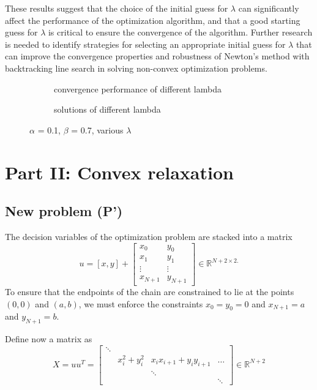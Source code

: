 \documentclass[10pt,a4paper,notitlepage,twocolumn]{article}
\begin{document}
These results suggest that the choice of the initial guess for $\lambda$ can significantly affect the performance of the optimization algorithm, and that a good starting guess for $\lambda$ is critical to ensure the convergence of the algorithm. Further research is needed to identify strategies for selecting an appropriate initial guess for $\lambda$ that can improve the convergence properties and robustness of Newton's method with backtracking line search in solving non-convex optimization problems.
\begin{figure}[htbp]
    \centering
    \begin{subfigure}[b]{0.4\textwidth}
    
    \caption{convergence performance of different lambda}
    \label{lambda1}
    \end{subfigure}
    \hfill
    \begin{subfigure}[b]{0.4\textwidth}  
    
    \caption{solutions of different lambda}
    \end{subfigure}
    \caption{$\alpha$ = 0.1, $\beta$ = 0.7, various $\lambda$}
    \label{lambda}
\end{figure}

\section{Part II: Convex relaxation}

\subsection{New problem (P')}
The decision variables of the optimization problem are stacked into a matrix 
\begin{equation*}
    u = [x,y] + 
    \begin{bmatrix}
        x_0 & y_0 \\
        x_1 & y_1 \\
        \vdots & \vdots \\
        x_{N+1} & y_{N+1}
    \end{bmatrix} \in \mathbb{R}^{N+2 \times 2.}
\end{equation*}
To ensure that the endpoints of the chain are constrained to lie at the points $(0,0)$ and $(a,b)$, we must enforce the constraints $x_0 = y_0 = 0$ and $x_{N+1} = a$ and $y_{N+1} = b$.

Define now a matrix as
\begin{equation*}
    X = uu^T = \begin{bmatrix}
        \ddots & & & \\
         & x_i^2+y_i^2 & x_i x_{i+1} + y_i y_{i+1} & \dots \\
         & & \ddots & \\
         & & & \ddots
    \end{bmatrix} \in \mathbb{R}^{N+2}
\end{equation*}
\end{document}

